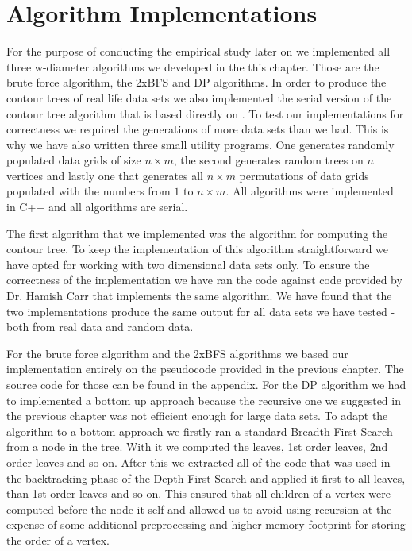 \section{Algorithm Implementations}

For the purpose of conducting the empirical study later on we implemented all three w-diameter algorithms we developed in the this chapter. Those are the brute force algorithm, the 2xBFS and DP algorithms. In order to produce the contour trees of real life data sets we also implemented the serial version of the contour tree algorithm that is based directly on \cite{carr-masters}. To test our implementations for correctness we required the generations of more data sets than we had. This is why we have also written three small utility programs. One generates randomly populated data grids of size $n \times m$, the second generates random trees on $n$ vertices and lastly one that generates all $n \times m$ permutations of data grids populated with the numbers from $1$ to $n \times m$.  All algorithms were implemented in C++ and all algorithms are serial.

The first algorithm that we implemented was the algorithm for computing the contour tree. To keep the implementation of this algorithm straightforward we have opted for working with two dimensional data sets only. To ensure the correctness of the implementation we have ran the code against code provided by Dr. Hamish Carr that implements the same algorithm. We have found that the two implementations produce the same output for all data sets we have tested - both from real data and random data.

For the brute force algorithm and the 2xBFS algorithms we based our implementation entirely on the pseudocode provided in the previous chapter. The source code for those can be found in the appendix. For the DP algorithm we had to implemented a bottom up approach because the recursive one we suggested in the previous chapter was not efficient enough for large data sets. To adapt the algorithm to a bottom approach we firstly ran a standard Breadth First Search from a node in the tree. With it we computed the leaves, 1st order leaves, 2nd order leaves and so on. After this we extracted all of the code that was used in the backtracking phase of the Depth First Search and applied it first to all leaves, than 1st order leaves and so on. This ensured that all children of a vertex were computed before the node it self and allowed us to avoid using recursion at the expense of some additional preprocessing and higher memory footprint for storing the order of a vertex.

